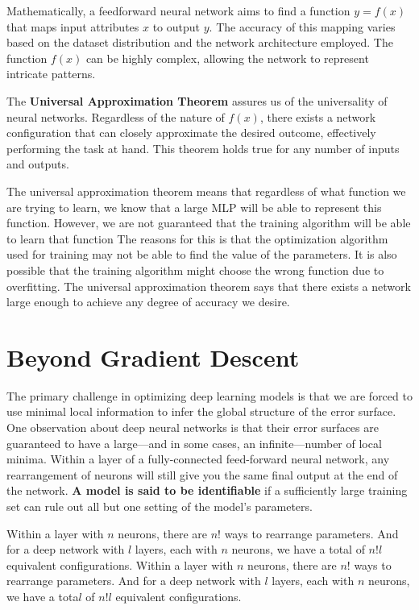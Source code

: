 \documentclass{report}
\begin{document}
Mathematically, a feedforward neural network aims to find a function \(y = f(x)\) that maps input attributes \(x\) to output \(y\). The accuracy of this mapping varies based on the dataset distribution and the network architecture employed. The function \(f(x)\) can be highly complex, allowing the network to represent intricate patterns.

The \textbf{Universal Approximation Theorem} assures us of the universality of neural networks. Regardless of the nature of \(f(x)\), there exists a network configuration that can closely approximate the desired outcome, effectively performing the task at hand. This theorem holds true for any number of inputs and outputs.

The universal approximation theorem means that regardless of what function we are trying to learn, we know that a large MLP will be able to represent this function. However, we are not guaranteed that the training algorithm will be able to learn that function The reasons for this is that the optimization algorithm used for training may not be able to find the value of the parameters. It is also possible that the training algorithm might choose the wrong function due to overfitting. The universal approximation theorem says that there exists a network large enough to achieve any degree of accuracy we desire.

\section{Beyond Gradient Descent}
The primary challenge in optimizing deep learning models is that we are forced to use minimal local information to infer the global structure of the error surface. One observation about deep neural networks is that their error surfaces are guaranteed to have a large—and in some cases, an infinite—number of local minima. Within a layer of a fully-connected feed-forward neural network, any rearrangement of neurons will still give you the same final output at the end of the network. \textbf{A model is said to be identifiable} if a sufficiently large training set can rule out all but one setting of the model’s parameters.

Within a layer with $n$ neurons, there are $n!$ ways to rearrange parameters. And for a deep network with $l$ layers, each with $n$ neurons, we have a total of $n!l$ equivalent configurations. Within a layer with $n$ neurons, there are $n!$ ways to rearrange parameters. And for a deep network with $l$ layers, each with $n$ neurons, we have a tota$l$ of $n!l$ equivalent configurations.
\end{document}
